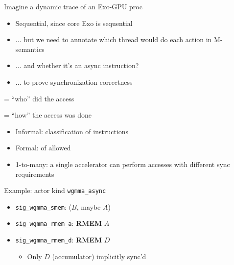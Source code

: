 \newpage
\begin{minipage}[t]{0.48\textwidth}\fixminipage
\vspace{-5mm}

\vspace{4mm}
Imagine a dynamic trace of an Exo-GPU proc
\begin{itemize}
  \item Sequential, since core Exo is sequential
  \item ... but we need to annotate which thread would do each action in M-semantics
  \item ... and whether it's an async instruction?
  \item ... to prove synchronization correctness
\end{itemize}
 = ``who'' did the access

 = ``how'' the access was done

\begin{itemize}
  \item Informal: classification of instructions
  \item Formal:  of allowed 
  \item 1-to-many: a single accelerator can perform accesses with different sync requirements
\end{itemize}

Example: actor kind \texttt{wgmma\_async}
\begin{itemize}
  \item \texttt{sig\_wgmma\_smem}:  ($B$, maybe $A$)
  \item \texttt{sig\_wgmma\_rmem\_a}: \textbf{RMEM} $A$
  \item \texttt{sig\_wgmma\_rmem\_d}: \textbf{RMEM} $D$
  \begin{itemize}
    \item Only $D$ (accumulator) implicitly sync'd
  \end{itemize}
\end{itemize}

\end{minipage}
\hfill
